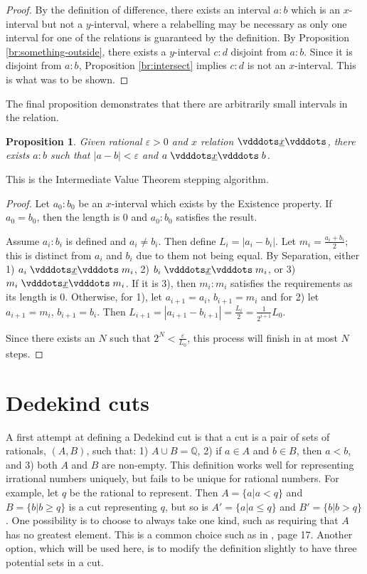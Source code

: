 \documentclass[12pt]{article}
\newtheorem{proposition}{Proposition}[section]
\begin{document}
\begin{proof}
    By the definition of difference, there exists an interval $a:b$ which is an $x$-interval but not a $y$-interval, where a relabelling may be necessary as only one interval for one of the relations is guaranteed by the definition. By Proposition \ref{br:something-outside}, there exists a $y$-interval $c:d$ disjoint from $a:b$. Since it is disjoint from $a:b$, Proposition \ref{br:intersect} implies $c:d$ is not an $x$-interval. This is what was to be shown. 
\end{proof}


The final proposition demonstrates that there are arbitrarily small intervals in the relation. 

\begin{proposition}
    Given rational $\varepsilon >0$ and $x$ relation $\xrel$, there exists $a:b$ such that $|a-b| < \varepsilon$ and $a \xrel b$. 
\end{proposition}

This is the Intermediate Value Theorem stepping algorithm. 

\begin{proof}
    Let $a_0:b_0$ be an $x$-interval which exists by the Existence property. If $a_0 = b_0$, then the length is 0 and $a_0:b_0$ satisfies the result. 
    
    Assume $a_i:b_i$ is defined and $a_i \neq b_i$. Then define $L_i = |a_i - b_i|$. Let $m_i = \frac{a_i + b_i}{2}$; this is distinct from $a_i$ and $b_i$ due to them not being equal. By Separation, either 1) $a_i \xrel m_i$, 2) $b_i \xrel m_i$, or 3) $m_i \xrel m_i$. If it is 3), then $m_i:m_i$ satisfies the requirements as its length is 0. Otherwise, for 1), let $a_{i+1}= a_i$, $b_{i+1} = m_i$ and for 2) let $a_{i+1} = m_i$, $b_{i+1} = b_i$. Then $L_{i+1} = |a_{i+1} - b_{i+1}| = \frac{L_i}{2} = \frac{1}{2^{i+1}} L_0 $. 

    Since there exists an $N$ such that $2^N < \frac{\varepsilon}{L_0}$, this process will finish in at most $N$ steps. 

    
\end{proof}




\section{Dedekind cuts}

A first attempt at defining a Dedekind cut is that a cut is a pair of sets of rationals, $(A, B)$, such that: 1) $A \cup B = \mathbb{Q}$, 2) if $a \in A$ and $b \in B$, then $a < b$, and 3) both $A$ and $B$ are non-empty. This definition works well for representing irrational numbers uniquely, but fails to be unique for rational numbers. For example, let $q$ be the rational to represent. Then $A = \{a | a < q\}$ and $B= \{b | b \geq q\}$ is a cut representing $q$, but so is  $A' = \{a | a \leq q\}$ and $B'= \{b | b > q\}$. One possibility is to choose to always take one kind, such as requiring that $A$ has no greatest element. This is a common choice such as in \cite{rudin}, page 17. Another option, which will be used here, is to modify the definition slightly to have three potential sets in a cut.
\end{document}
